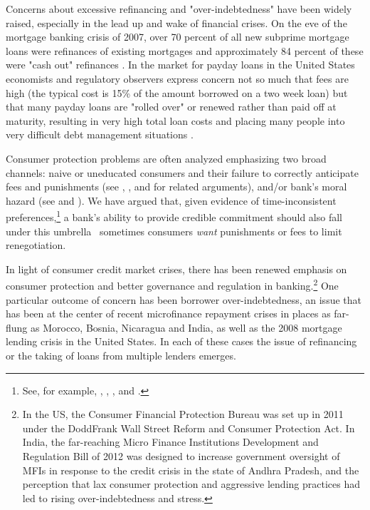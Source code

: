 \documentclass[11pt,english]{article}
\theoremstyle{plain}
\theoremstyle{definition}
\begin{document}
Concerns about excessive refinancing and "over-indebtedness" have
been widely raised, especially in the lead up and wake of financial crises.
On the eve of the mortgage banking crisis of 2007, over 70 percent
of all new subprime mortgage loans were refinances of existing mortgages
and approximately 84 percent of these were "cash out" refinances \citep{demyanyk2011}.
In the market for payday loans in the United States economists and
regulatory observers express concern not so much that fees are high
(the typical cost is 15\% of the amount borrowed on a two week loan)
but that many payday loans are "rolled over" or renewed
rather than paid off at maturity, resulting in very high total loan costs and placing
many people into very difficult debt management situations \citep{deyoung2015}.

Consumer protection problems are often analyzed emphasizing two
broad channels: naive or uneducated consumers and their failure to correctly
anticipate fees and punishments (see \citet{gabaix2006},
\citet{armstrong2012}, and \citet{akerlof2015} for related arguments),
and/or bank's moral hazard (see \citet{dewatripont1999} and \citet{oak2010}).
We have argued that, given evidence of time-inconsistent
preferences,\footnote{See, for example, \citet{laibson2003}, \citet{ashraf2006},
\citet{gugerty2007}, and \citet{tanaka2010}.} a bank's ability to provide credible commitment should also fall
under this umbrella \textendash\  sometimes consumers \textit{want} punishments
or fees to limit renegotiation.

In light of consumer credit
market crises, there has been renewed emphasis on consumer protection and
better governance and regulation in banking.\footnote{In the US, the Consumer Financial Protection Bureau was set up in
2011 under the Dodd\textendash Frank Wall Street Reform and Consumer
Protection Act. In India, the far-reaching Micro Finance Institutions
Development and Regulation Bill of 2012 was designed to increase government
oversight of MFIs in response to the credit crisis in the state of
Andhra Pradesh, and the perception that lax consumer protection and
aggressive lending practices had led to rising over-indebtedness and
stress.} One particular outcome of concern has been borrower over-indebtedness,
an issue that has been at the center of recent microfinance repayment
crises in places as far-flung as Morocco, Bosnia, Nicaragua and India,
as well as the 2008 mortgage lending crisis in the United States.
In each of these cases the issue of refinancing or the taking of loans
from multiple lenders emerges.
\end{document}
